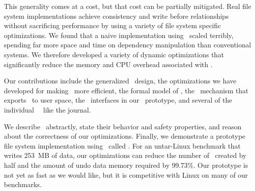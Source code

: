 \begin{comment}
The \Kudos\ storage system implementation is decomposed entirely into
 pluggable \modules\ that manipulate \patches, hopefully making the system
 as a whole more configurable, extensible, and easier to understand.
%
Any storage system \module\ can generate \patches; other modules can examine
 them and modify them when required.
%
\Patch\ dependencies are obeyed by all other storage system layers, allowing
 them to be passed through layers such as loopback block devices.
%
As a result, the loosely-coupled \modules\ that implement a file system
 can cooperate to enforce strong and often complex consistency guarantees,
 even though each \module\ only does a small part of the work.
\end{comment}


This generality comes at a cost, but that cost can be partially mitigated.
%
Real file system implementations achieve consistency and write before
 relationships without sacrificing performance by using a variety of file
 system specific optimizations.
%
We found that a naive implementation using \patches\ scaled terribly,
 spending far more space and time on dependency manipulation than
 conventional systems.
%
We therefore developed a variety of dynamic optimizations that
 significantly reduce the memory and CPU overhead associated with \patches.


Our contributions include the generalized \patch\ design, the
 optimizations we have developed for making \patches\ more efficient,
 the formal model of \patches, the \patchgroup\ mechanism that exports
 \patches\ to user space, the \module\ interfaces in our \Kudos\
 prototype, and several of the individual \Kudos\ \modules\ like the
 journal.


We describe \patches\ abstractly, state their behavior and safety
 properties, and reason about the correctness of our optimizations.
%
Finally, we demonstrate a prototype file system implementation using
 \patches\ called \Kudos.
%
For an untar-Linux benchmark that writes 253~MB of data, our optimizations
 can reduce the number of \patches\ created by half and the amount of
 undo data memory required by 99.73\%. 
%
Our prototype is not yet as fast as we would like, but it is competitive
 with Linux on many of our benchmarks.
